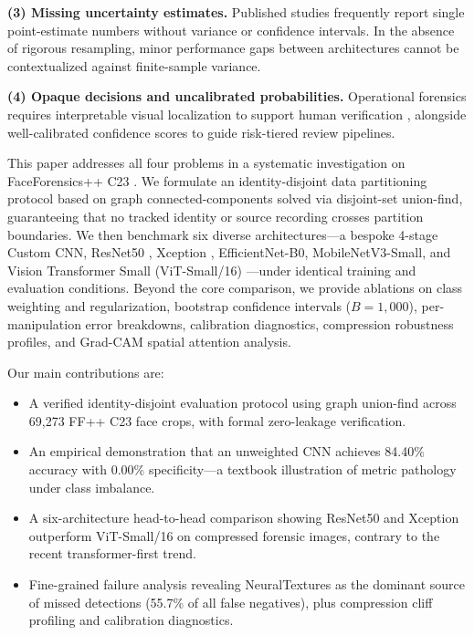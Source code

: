 \documentclass[conference]{IEEEtran}
\begin{document}
\textbf{(3) Missing uncertainty estimates.} Published studies frequently report single point-estimate numbers without variance or confidence intervals. In the absence of rigorous resampling, minor performance gaps between architectures cannot be contextualized against finite-sample variance.

\textbf{(4) Opaque decisions and uncalibrated probabilities.} Operational forensics requires interpretable visual localization to support human verification \cite{selvaraju2017gradcam}, alongside well-calibrated confidence scores to guide risk-tiered review pipelines.

This paper addresses all four problems in a systematic investigation on FaceForensics++ C23 \cite{rossler2019faceforensics}. We formulate an identity-disjoint data partitioning protocol based on graph connected-components solved via disjoint-set union-find, guaranteeing that no tracked identity or source recording crosses partition boundaries. We then benchmark six diverse architectures---a bespoke 4-stage Custom CNN, ResNet50 \cite{he2016resnet}, Xception \cite{chollet2017xception}, EfficientNet-B0, MobileNetV3-Small, and Vision Transformer Small (ViT-Small/16) \cite{dosovitskiy2020vit}---under identical training and evaluation conditions. Beyond the core comparison, we provide ablations on class weighting and regularization, bootstrap confidence intervals ($B{=}1{,}000$), per-manipulation error breakdowns, calibration diagnostics, compression robustness profiles, and Grad-CAM spatial attention analysis.

Our main contributions are:
\begin{itemize}
    \item A verified identity-disjoint evaluation protocol using graph union-find across 69,273 FF++ C23 face crops, with formal zero-leakage verification.
    \item An empirical demonstration that an unweighted CNN achieves 84.40\% accuracy with 0.00\% specificity---a textbook illustration of metric pathology under class imbalance.
    \item A six-architecture head-to-head comparison showing ResNet50 and Xception outperform ViT-Small/16 on compressed forensic images, contrary to the recent transformer-first trend.
    \item Fine-grained failure analysis revealing NeuralTextures as the dominant source of missed detections (55.7\% of all false negatives), plus compression cliff profiling and calibration diagnostics.
\end{itemize}
\end{document}
